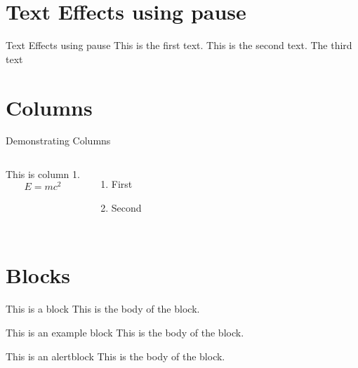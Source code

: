\documentclass{beamer}
\begin{document}
	\section{Text Effects using pause}
	\begin{frame}{Text Effects using pause}
		This is the first text. \pause
		This is the second text. \pause
		The third text
	\end{frame}

	\section{Columns}
		\begin{frame}{Demonstrating Columns}
			\begin{columns}
					This is column 1.
					$$ E = mc^2 $$
					\begin{enumerate}
						\item First
						\item Second
					\end{enumerate}
			\end{columns}
		\end{frame}
	
	\section{Blocks}
		\begin{frame}
			\begin{block}{This is a block}
				This is the body of the block.
			\end{block}
		
			\begin{example}{This is an example block}
				This is the body of the block.
			\end{example}
		
			\begin{alertblock}{This is an alertblock}
				This is the body of the block.
			\end{alertblock}
		\end{frame}
	
\end{document}

